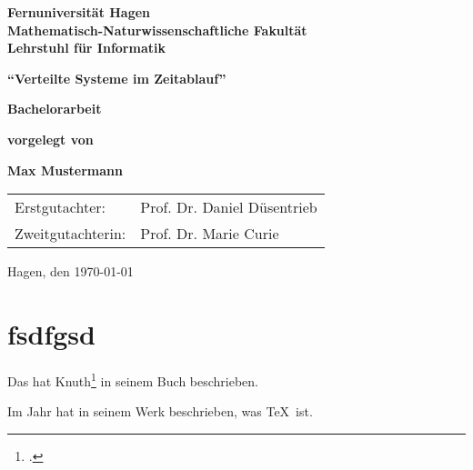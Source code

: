 \documentclass[12pt,ngerman,parskip=half]{scrbook}
\makeatletter
\renewcommand{\appendixtocname}{List of appendices}
\newcommand{\listofappendices}{%
  \begingroup
  \renewcommand{\contentsname}{\appendixtocname}
  \let\@oldstarttoc\@starttoc
  \def\@starttoc##1{\@oldstarttoc{app}}
  \tableofcontents%
  \endgroup
}
\makeatother
\begin{document}
\begin{titlepage}
{\large\bfseries Fernuniversität Hagen \\
Mathematisch-Naturwissenschaftliche Fakultät \\
Lehrstuhl für Informatik}

\vspace*{5cm}
\begin{center}
{\LARGE\bfseries\enquote{Verteilte Systeme im Zeitablauf}}
\end{center}

\vspace*{1cm}
\begin{center}
{\Large\bfseries Bachelorarbeit}
\end{center}


\begin{center}
{\large\bfseries  vorgelegt von }
\end{center}

\begin{center}
{\Large\bfseries Max Mustermann}
\end{center}


\vfill
\begin{tabular}{ll}
Erstgutachter: & Prof. Dr. Daniel Düsentrieb \\
Zweitgutachterin: & Prof. Dr. Marie Curie \\
\end{tabular}

\hfill Hagen, den \today
\end{titlepage}



\tableofcontents

\listoffigures

\listofappendices

\chapter{fsdfgsd}

\cite{knuth:1984}

\cite{ziegenhagen:2017}

\parencite{knuth:1984}

\cite{ziegenhagen:2017}

\cite{Bohmann:2017}

Das hat Knuth\footcite{knuth:1984} in seinem Buch beschrieben.

Im Jahr \citeyear{knuth:1984} hat \citeauthor{knuth:1984} in seinem Werk  beschrieben, was \TeX\ ist.
\end{document}
